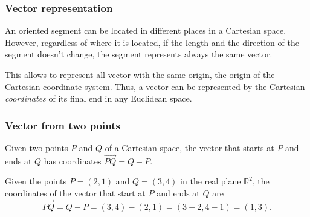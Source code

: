 \begin{frame}
\frametitle{Vector representation}
An oriented segment can be located in different places in a Cartesian space.  
However, regardless of where it is located, if the length and the direction of the segment doesn't change, the segment represents always the same vector. 

This allows to represent all vector with the same origin, the origin of the Cartesian coordinate system.
Thus, a vector can be represented by the Cartesian \emph{coordinates} of its final end in any Euclidean space.

\begin{center}

\end{center}
\end{frame}


\begin{frame}
\frametitle{Vector from two points}
Given two points $P$ and $Q$ of a Cartesian space, the vector that starts at $P$ and ends at $Q$ has coordinates 
$\vec{PQ}=Q-P$.

 Given the points $P=(2,1)$ and $Q=(3,4)$ in the real plane $\mathbb{R}^2$, the coordinates of the vector that start at $P$ and ends at $Q$ are
\[
\vec{PQ} = Q-P = (3,4)-(2,1) = (3-2,4-1) = (1,3).
\]
\begin{center}

\end{center}
\end{frame}

